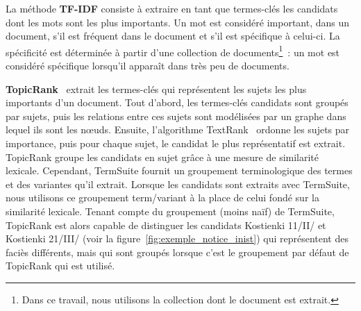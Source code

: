     La méthode \textbf{TF-IDF} consiste à extraire en tant que termes-clés les
    candidats dont les mots sont les plus importants. Un mot est considéré
    important, dans un document, s'il est fréquent dans le document et s'il est
    spécifique à celui-ci. La spécificité est déterminée à partir d'une
    collection de documents\footnote{Dans ce travail, nous utilisons la
    collection dont le document est extrait.}~: un mot est considéré spécifique
    lorsqu'il apparaît dans très peu de documents.

    \textbf{TopicRank}~\cite{bougouin2013topicrank} extrait les termes-clés qui
    représentent les sujets les plus importants d'un document. Tout d'abord, les
    termes-clés candidats sont groupés par sujets, puis les relations entre ces
    sujets sont modélisées par un graphe dans lequel ils sont les n\oe{}uds.
    Ensuite, l'algorithme TextRank~\cite{mihalcea2004textrank} ordonne les
    sujets par importance, puis pour chaque sujet, le candidat le plus
    représentatif est extrait. TopicRank groupe les candidats en sujet grâce à
    une mesure de similarité lexicale. Cependant, TermSuite fournit un
    groupement terminologique des termes et des variantes qu'il extrait. Lorsque
    les candidats sont extraits avec TermSuite, nous utilisons ce groupement
    term/variant à la place de celui fondé sur la similarité lexicale. Tenant
    compte du groupement (moins naïf) de TermSuite, TopicRank est alors capable
    de distinguer les candidats \og{}Kostienki 11/II/\fg{} et \og{}Kostienki
    21/III/\fg{} (voir la figure~\ref{fig:exemple_notice_inist}) qui
    représentent des faciès différents, mais qui sont groupés lorsque c'est le
    groupement par défaut de TopicRank qui est utilisé.

